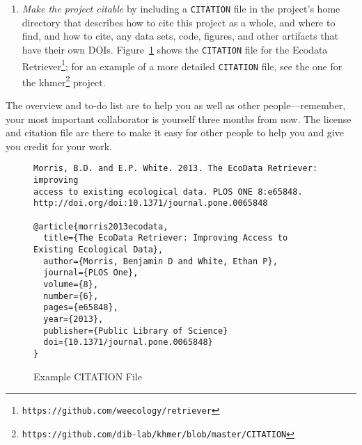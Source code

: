 \documentclass[10pt]{article}
\newcommand{\recommend}[1]{\textit{#1}}
\newcommand{\withurl}[2]{{#1}\footnote{\texttt{#2}}}
\begin{document}
\begin{enumerate}
  \begin{framed}
    \noindent \textbf{What Not To Do}

    We recommend \emph{against} the ``no commercial use'' variations of
    the Creative Commons licenses because they may impede some forms of
    re-use.  For example, if a researcher in a developing country is being
    paid by her government to compile a public health report, and wishes
    to include some of your data, she will be unable to do so if the
    license says ``non-commercial''. We recommend permissive software
    licenses rather than the \withurl{GNU General Public
      License}{https://www.safaribooksonline.com/library/view/understanding-open-source/0596005814/ch03.html}
    (GPL) because it is easier to integrate permissively-licensed software
    into other projects. (Note that it is straightforward to switch from a
    permissive license to the GPL if you should change your mind later but
    rather more complicated to go in the other direction.)
  \end{framed}

\item    
  \recommend{Make the project citable} by including a
  \texttt{CITATION} file in the project's home directory that
  describes how to cite this project as a whole, and where to find,
  and how to cite, any data sets, code, figures, and other artifacts
  that have their own DOIs.  Figure~\ref{fig:citation} shows the
  \texttt{CITATION} file for the \withurl{Ecodata
    Retriever}{https://github.com/weecology/retriever}; for an example
  of a more detailed \texttt{CITATION} file, see the one for the
  \withurl{khmer}{https://github.com/dib-lab/khmer/blob/master/CITATION}
  project.

\end{enumerate}

The overview and to-do list are to help you as well as other
people---remember, your most important collaborator is yourself three
months from now. The license and citation file are there to make it
easy for other people to help you and give you credit for your work.

\begin{figure}
\begin{verbatim}
Morris, B.D. and E.P. White. 2013. The EcoData Retriever: improving
access to existing ecological data. PLOS ONE 8:e65848.
http://doi.org/doi:10.1371/journal.pone.0065848

@article{morris2013ecodata,
  title={The EcoData Retriever: Improving Access to Existing Ecological Data},
  author={Morris, Benjamin D and White, Ethan P},
  journal={PLOS One},
  volume={8},
  number={6},
  pages={e65848},
  year={2013},
  publisher={Public Library of Science}
  doi={10.1371/journal.pone.0065848}
}
\end{verbatim}
\caption{Example CITATION File}
\label{fig:citation}
\end{figure}
\end{document}
